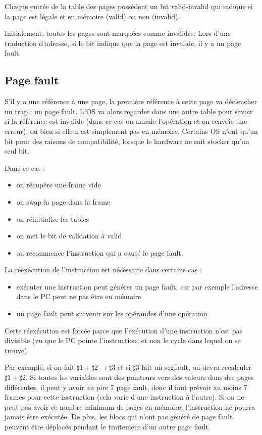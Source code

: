 	Chaque entrée de la table des pages possèdent un bit valid-invalid qui indique si la page est légale et en mémoire (valid) ou non (invalid).
	
	Initialement, toutes les pages sont marquées comme invalides. Lors d'une traduction d'adresse, si le bit indique que la page est invalide, il y a un page fault.
		
	\subsection{Page fault}
	
	S'il y a une référence à une page, la première référence à cette page va déclencher un trap : un page fault. L'OS va alors regarder dans une autre table pour savoir si la référence est invalide (dans ce cas on annule l'opération et on renvoie une erreur), ou bien si elle n'est simplement pas en mémoire. Certains OS n'ont qu'un bit pour des raisons de compatibilité, lorsque le hardware ne sait stocker qu'un seul bit.
	
	Dans ce cas :
	
	\begin{itemize}
		\item on récupère une frame vide
		\item on swap la page dans la frame
		\item on réinitialise les tables
		\item on met le bit de validation à valid
		\item on recommence l'instruction qui a causé le page fault.
	\end{itemize}
	
	La réexécution de l'instruction est nécessaire dans certains cas :
	
	\begin{itemize}
		\item exécuter une instruction peut générer un page fault, car par exemple l'adresse dans le PC peut ne pas être en mémoire
		\item un page fault peut survenir sur les opérandes d'une opération
	\end{itemize}
	
	Cette réexécution est forcée parce que l'exécution d'une instruction n'est pas divisible (vu que le PC pointe l'instruction, et non le cycle dans lequel on se trouve).
	
	Par exemple, si on fait $\sharp 1 + \sharp 2 \rightarrow \sharp 3$ et si $\sharp 3$ fait un segfault, on devra recalculer $\sharp 1 + \sharp 2$. Si toutes les variables sont des pointeurs vers des valeurs dans des pages différentes, il peut y avoir au pire 7 page fault, donc il faut prévoir au moins 7 frames pour cette instruction (cela varie d'une instruction à l'autre). Si on ne peut pas avoir ce nombre minimum de pages en mémoire, l'instruction ne pourra jamais être exécutée. De plus, les blocs qui n'ont pas généré de page fault peuvent être déplacés pendant le traitement d'un autre page fault.
	
